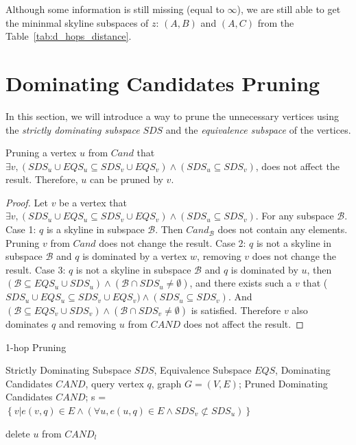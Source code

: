 Although some information is still missing (equal to $\infty$), we are still able to get the mininmal skyline subspaces of $z$: $(A, B)$ and $(A, C)$ from the Table~\ref{tab:d_hops_distance}.

\section{Dominating Candidates Pruning}

In this section, we will introduce a way to prune the unnecessary vertices using the \emph{strictly dominating subspace} $SDS$ and the \emph{equivalence subspace} of the vertices.

\begin{property}
\label{ppt:prune_cand}
Pruning a vertex $u$ from $Cand$ that $\exists v, (SDS_u \cup EQS_u \subseteq SDS_v \cup EQS_v) \wedge (SDS_u \subseteq SDS_v)$, does not affect the result. Therefore, $u$ can be pruned by $v$.
\end{property}

\begin{proof}
Let $v$ be a vertex that $\exists v, (SDS_u \cup EQS_u \subseteq SDS_v \cup EQS_v) \wedge (SDS_u \subseteq SDS_v)$. For any subspace $\mathcal{B}$. Case 1: $q$ is a skyline in subspace $\mathcal{B}$. Then $Cand_\mathcal{B}$ does not contain any elements. Pruning $v$ from $Cand$ does not change the result.
Case 2: $q$ is not a skyline in subspace $\mathcal{B}$ and $q$ is dominated by a vertex $w$, removing $v$ does not change the result. Case 3: $q$ is not a skyline in subspace $\mathcal{B}$ and $q$ is dominated by $u$, then $(\mathcal{B} \subseteq EQS_u \cup SDS_u) \wedge (\mathcal{B} \cap SDS_u \not= \emptyset)$, and there exists such a $v$ that ($SDS_u \cup EQS_u \subseteq SDS_v \cup EQS_v) \wedge (SDS_u \subseteq SDS_v)$. And $(\mathcal{B} \subseteq EQS_v \cup SDS_v) \wedge (\mathcal{B} \cap SDS_v \not= \emptyset)$ is satisfied. Therefore $v$ also dominates $q$ and removing $u$ from $CAND$ does not affect the result.
\end{proof}

\begin{algorithm}[H]
  \caption{1-hop Pruning}
  \label{algo:blah}
  \begin{algorithmic}[1]
  \show\LOOP
    \REQUIRE Strictly Dominating Subspace $SDS$, Equivalence Subspace $EQS$, Dominating Candidates $CAND$, query vertex $q$, graph $G=(V, E)$;
    \ENSURE Pruned Dominating Candidates $CAND$;
    \STATE s = $\left\{v|e(v, q) \in E \wedge (\forall u, e(u, q) \in E \wedge SDS_v \not\subset SDS_u)\right\}$
    
                    \STATE delete $u$ from $CAND_l$
                \ENDIF
                
            \ENDFOR
        \ENDFOR
    \ENDFOR
  \end{algorithmic}
\end{algorithm}



